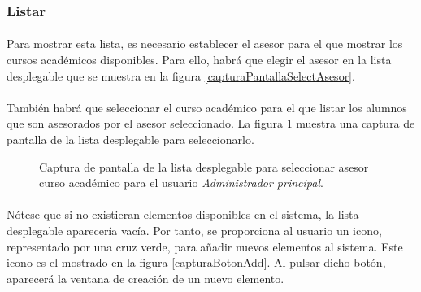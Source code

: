 \subsubsection{Listar}

  \paragraph{}Para mostrar esta lista, es necesario establecer el asesor para
  el que mostrar los cursos académicos disponibles. Para ello, habrá que elegir
  el asesor en la lista desplegable que se muestra en la figura
  \ref{capturaPantallaSelectAsesor}.

  \paragraph{}También habrá que seleccionar el curso académico para el que
  listar los alumnos que son asesorados por el asesor seleccionado. La figura
  \ref{capturaPantallaSelectAsesorCursoAcademico} muestra una captura de
  pantalla de la lista desplegable para seleccionarlo.

  \begin{figure}[!ht]
    \begin{center}
      \caption{Captura de pantalla de la lista desplegable para seleccionar asesor curso académico para el usuario \textit{Administrador principal}.}
      \label{capturaPantallaSelectAsesorCursoAcademico}
    \end{center}
  \end{figure}

  \paragraph{}Nótese que si no existieran elementos disponibles en el sistema,
  la lista desplegable aparecería vacía. Por tanto, se proporciona al usuario
  un icono, representado por una cruz verde, para añadir nuevos elementos al
  sistema. Este icono es el mostrado en la figura \ref{capturaBotonAdd}. Al
  pulsar dicho botón, aparecerá la ventana de creación de un nuevo elemento.

